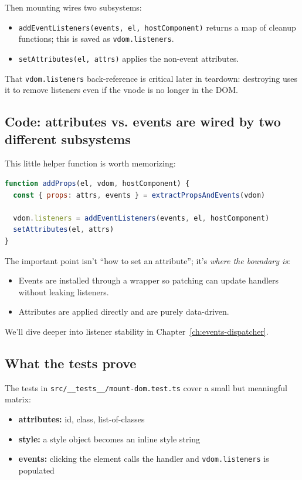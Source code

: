 Then mounting wires two subsystems:

\begin{itemize}
  \item \texttt{addEventListeners(events, el, hostComponent)} returns a map of cleanup functions; this is saved as \texttt{vdom.listeners}.
  \item \texttt{setAttributes(el, attrs)} applies the non-event attributes.
\end{itemize}

That \texttt{vdom.listeners} back-reference is critical later in teardown: destroying uses it to remove listeners even if the vnode is no longer in the DOM.

\subsection*{Code: attributes vs. events are wired by two different subsystems}
This little helper function is worth memorizing:

\begin{lstlisting}[language=JavaScript]
function addProps(el, vdom, hostComponent) {
  const { props: attrs, events } = extractPropsAndEvents(vdom)

  vdom.listeners = addEventListeners(events, el, hostComponent)
  setAttributes(el, attrs)
}
\end{lstlisting}

The important point isn't ``how to set an attribute''; it's \emph{where the boundary is}:

\begin{itemize}
  \item Events are installed through a wrapper so patching can update handlers without leaking listeners.
  \item Attributes are applied directly and are purely data-driven.
\end{itemize}

We'll dive deeper into listener stability in Chapter~\ref{ch:events-dispatcher}.

\subsection*{What the tests prove}
The tests in \texttt{src/\_\_tests\_\_/mount-dom.test.ts} cover a small but meaningful matrix:

\begin{itemize}
  \item \textbf{attributes:} id, class, list-of-classes
  \item \textbf{style:} a style object becomes an inline style string
  \item \textbf{events:} clicking the element calls the handler and \texttt{vdom.listeners} is populated
\end{itemize}

